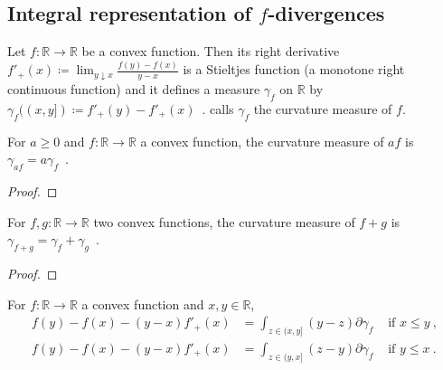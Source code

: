 \subsection{Integral representation of $f$-divergences}


\begin{definition}
  \label{def:curvatureMeasure}
  \leanok
  \uses{}
  Let $f: \mathbb{R} \to \mathbb{R}$ be a convex function. Then its right derivative $f'_+(x) \coloneqq \lim_{y \downarrow x}\frac{f(y) - f(x)}{y - x}$ is a Stieltjes function (a monotone right continuous function) and it defines a measure $\gamma_f$ on $\mathbb{R}$ by $\gamma_f((x,y]) \coloneqq f'_+(y) - f'_+(x)$~. \cite{liese2012phi} calls $\gamma_f$ the curvature measure of $f$.
\end{definition}


\begin{lemma}
  \label{lem:curvatureMeasure_mul}
  For $a \ge 0$ and $f: \mathbb{R} \to \mathbb{R}$ a convex function, the curvature measure of $af$ is $\gamma_{af} = a \gamma_f$~.
\end{lemma}

\begin{proof}%
\uses{}

\end{proof}


\begin{lemma}
  \label{lem:curvatureMeasure_add}
  For $f,g: \mathbb{R} \to \mathbb{R}$ two convex functions, the curvature measure of $f+g$ is $\gamma_{f+g} = \gamma_f + \gamma_g$~.
\end{lemma}

\begin{proof}%
\uses{}

\end{proof}


\begin{lemma}
  \label{lem:convex_taylor}
  \leanok
  For $f: \mathbb{R} \to \mathbb{R}$ a convex function and $x,y \in \mathbb{R}$,
  \begin{align*}
  f(y) - f(x) - (y - x)f'_+(x) &= \int_{z \in (x,y]} (y - z) \partial \gamma_f & \text{ if } x \le y \: ,
  \\
  f(y) - f(x) - (y - x)f'_+(x) &= \int_{z \in (y,x]} (z - y) \partial \gamma_f & \text{ if } y \le x \: .
  \end{align*}
\end{lemma}


